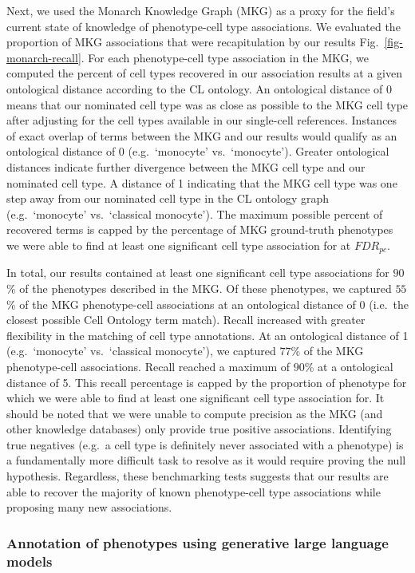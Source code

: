 \documentclass[
]{article}
\begin{document}
Next, we used the Monarch Knowledge Graph (MKG) as a proxy for the
field's current state of knowledge of phenotype-cell type associations.
We evaluated the proportion of MKG associations that were recapitulation
by our results Fig.~\ref{fig-monarch-recall}. For each phenotype-cell
type association in the MKG, we computed the percent of cell types
recovered in our association results at a given ontological distance
according to the CL ontology. An ontological distance of 0 means that
our nominated cell type was as close as possible to the MKG cell type
after adjusting for the cell types available in our single-cell
references. Instances of exact overlap of terms between the MKG and our
results would qualify as an ontological distance of 0 (e.g.~`monocyte'
vs.~`monocyte'). Greater ontological distances indicate further
divergence between the MKG cell type and our nominated cell type. A
distance of 1 indicating that the MKG cell type was one step away from
our nominated cell type in the CL ontology graph (e.g.~`monocyte'
vs.~`classical monocyte'). The maximum possible percent of recovered
terms is capped by the percentage of MKG ground-truth phenotypes we were
able to find at least one significant cell type association for at
\(FDR_{pc}\).

In total, our results contained at least one significant cell type
associations for \(90\)\% of the phenotypes described in the MKG. Of
these phenotypes, we captured \(55\)\% of the MKG phenotype-cell
associations at an ontological distance of 0 (i.e.~the closest possible
Cell Ontology term match). Recall increased with greater flexibility in
the matching of cell type annotations. At an ontological distance of 1
(e.g.~`monocyte' vs.~`classical monocyte'), we captured \(77\)\% of the
MKG phenotype-cell associations. Recall reached a maximum of \(90\)\% at
a ontological distance of 5. This recall percentage is capped by the
proportion of phenotype for which we were able to find at least one
significant cell type association for. It should be noted that we were
unable to compute precision as the MKG (and other knowledge databases)
only provide true positive associations. Identifying true negatives
(e.g.~a cell type is definitely never associated with a phenotype) is a
fundamentally more difficult task to resolve as it would require proving
the null hypothesis. Regardless, these benchmarking tests suggests that
our results are able to recover the majority of known phenotype-cell
type associations while proposing many new associations.

\subsubsection{Annotation of phenotypes using generative large language
models}\label{annotation-of-phenotypes-using-generative-large-language-models}
\end{document}
